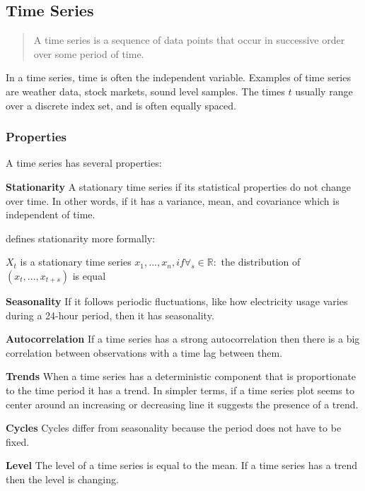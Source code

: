 \subsection{Time Series}
\label{sec:time-series}
\begin{quote}
    A time series is a sequence of data
    points that occur in successive order over some period of time.
\end{quote}
\cite{Hayes}

In a time series, time is often the independent variable.
Examples of time series are weather data, stock markets, sound level samples.
The times $t$ usually range over a discrete index set, and is often equally spaced.

\subsubsection{Properties}
A time series has several properties:

\textbf{Stationarity}
A stationary time series if its statistical properties do not change over time.
In other words, if it has a variance, mean, and covariance which is independent of time.

\cite{RobJHyndman2014} defines stationarity more formally:
\begin{definition}
   $X_t$ is a stationary time series 
   $x_1, ..., x_n, if \forall_s \in \mathbb{R} :$
   the distribution of $(x_t, ..., x_{t+s})$ is equal
\end{definition}

\textbf{Seasonality}
If it follows periodic fluctuations, like how electricity usage varies during a 24-hour period,
then it has seasonality.

\textbf{Autocorrelation}
If a time series has a strong autocorrelation then there is a big
correlation between observations with a time lag between them.

\textbf{Trends}
When a time series has a deterministic component that is proportionate to the time period it has a trend.
In simpler terms, if a time series plot seems to center around an increasing or decreasing line it suggests the presence of a trend.

\textbf{Cycles}
Cycles differ from seasonality because the period does not have to be fixed.


\textbf{Level}
The level of a time series is equal to the mean. If a time series has a trend
then the level is changing.


